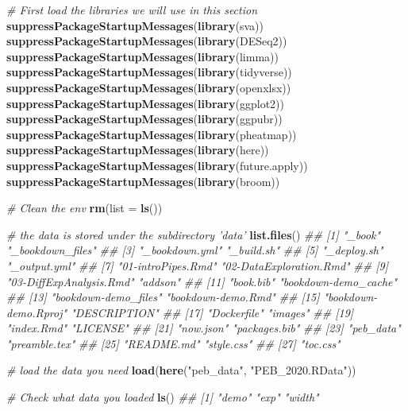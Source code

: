 \documentclass[]{book}
\newenvironment{Shaded}{\begin{snugshade}}{\end{snugshade}}
\newcommand{\CommentTok}[1]{\textcolor[rgb]{0.56,0.35,0.01}{\textit{#1}}}
\newcommand{\DataTypeTok}[1]{\textcolor[rgb]{0.13,0.29,0.53}{#1}}
\newcommand{\KeywordTok}[1]{\textcolor[rgb]{0.13,0.29,0.53}{\textbf{#1}}}
\newcommand{\NormalTok}[1]{#1}
\newcommand{\StringTok}[1]{\textcolor[rgb]{0.31,0.60,0.02}{#1}}
\begin{document}
\begin{Shaded}
\begin{Highlighting}[]
\CommentTok{# First load the libraries we will use in this section}
\KeywordTok{suppressPackageStartupMessages}\NormalTok{(}\KeywordTok{library}\NormalTok{(sva))}
\KeywordTok{suppressPackageStartupMessages}\NormalTok{(}\KeywordTok{library}\NormalTok{(DESeq2))}
\KeywordTok{suppressPackageStartupMessages}\NormalTok{(}\KeywordTok{library}\NormalTok{(limma))}
\KeywordTok{suppressPackageStartupMessages}\NormalTok{(}\KeywordTok{library}\NormalTok{(tidyverse))}
\KeywordTok{suppressPackageStartupMessages}\NormalTok{(}\KeywordTok{library}\NormalTok{(openxlsx))}
\KeywordTok{suppressPackageStartupMessages}\NormalTok{(}\KeywordTok{library}\NormalTok{(ggplot2))}
\KeywordTok{suppressPackageStartupMessages}\NormalTok{(}\KeywordTok{library}\NormalTok{(ggpubr))}
\KeywordTok{suppressPackageStartupMessages}\NormalTok{(}\KeywordTok{library}\NormalTok{(pheatmap))}
\KeywordTok{suppressPackageStartupMessages}\NormalTok{(}\KeywordTok{library}\NormalTok{(here))}
\KeywordTok{suppressPackageStartupMessages}\NormalTok{(}\KeywordTok{library}\NormalTok{(future.apply))}
\KeywordTok{suppressPackageStartupMessages}\NormalTok{(}\KeywordTok{library}\NormalTok{(broom))}

\CommentTok{# Clean the env}
\KeywordTok{rm}\NormalTok{(}\DataTypeTok{list =} \KeywordTok{ls}\NormalTok{())}

\CommentTok{# the data is stored under the subdirectory 'data'}
\KeywordTok{list.files}\NormalTok{()}
\CommentTok{##  [1] "_book"                  "_bookdown_files"       }
\CommentTok{##  [3] "_bookdown.yml"          "_build.sh"             }
\CommentTok{##  [5] "_deploy.sh"             "_output.yml"           }
\CommentTok{##  [7] "01-introPipes.Rmd"      "02-DataExploration.Rmd"}
\CommentTok{##  [9] "03-DiffExpAnalysis.Rmd" "addson"                }
\CommentTok{## [11] "book.bib"               "bookdown-demo_cache"   }
\CommentTok{## [13] "bookdown-demo_files"    "bookdown-demo.Rmd"     }
\CommentTok{## [15] "bookdown-demo.Rproj"    "DESCRIPTION"           }
\CommentTok{## [17] "Dockerfile"             "images"                }
\CommentTok{## [19] "index.Rmd"              "LICENSE"               }
\CommentTok{## [21] "now.json"               "packages.bib"          }
\CommentTok{## [23] "peb_data"               "preamble.tex"          }
\CommentTok{## [25] "README.md"              "style.css"             }
\CommentTok{## [27] "toc.css"}

\CommentTok{# load the data you need}
\KeywordTok{load}\NormalTok{(}\KeywordTok{here}\NormalTok{(}\StringTok{"peb_data"}\NormalTok{, }\StringTok{"PEB_2020.RData"}\NormalTok{))}

\CommentTok{# Check what data you loaded}
\KeywordTok{ls}\NormalTok{()}
\CommentTok{## [1] "demo"  "exp"   "width"}
\end{Highlighting}
\end{Shaded}
\end{document}
